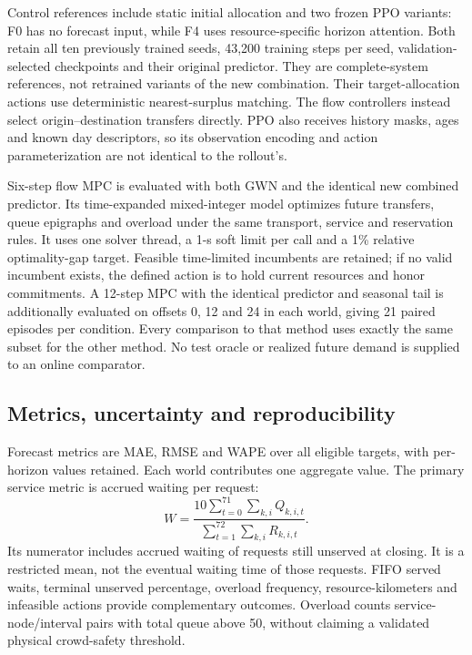 Control references include static initial allocation and two frozen PPO variants: F0 has no forecast input, while F4 uses resource-specific horizon attention. Both retain all ten previously trained seeds, 43,200 training steps per seed, validation-selected checkpoints and their original predictor. They are complete-system references, not retrained variants of the new combination. Their target-allocation actions use deterministic nearest-surplus matching. The flow controllers instead select origin--destination transfers directly. PPO also receives history masks, ages and known day descriptors, so its observation encoding and action parameterization are not identical to the rollout's.

Six-step flow MPC is evaluated with both GWN and the identical new combined predictor. Its time-expanded mixed-integer model optimizes future transfers, queue epigraphs and overload under the same transport, service and reservation rules. It uses one solver thread, a 1-s soft limit per call and a 1\% relative optimality-gap target. Feasible time-limited incumbents are retained; if no valid incumbent exists, the defined action is to hold current resources and honor commitments. A 12-step MPC with the identical predictor and seasonal tail is additionally evaluated on offsets 0, 12 and 24 in each world, giving 21 paired episodes per condition. Every comparison to that method uses exactly the same subset for the other method. No test oracle or realized future demand is supplied to an online comparator.

\subsection{Metrics, uncertainty and reproducibility}
Forecast metrics are MAE, RMSE and WAPE over all eligible targets, with per-horizon values retained. Each world contributes one aggregate value. The primary service metric is accrued waiting per request:
\begin{equation}
W=\frac{10\sum_{t=0}^{71}\sum_{k,i}Q_{k,i,t}}
        {\sum_{t=1}^{72}\sum_{k,i}R_{k,i,t}}.
\end{equation}
Its numerator includes accrued waiting of requests still unserved at closing. It is a restricted mean, not the eventual waiting time of those requests. FIFO served waits, terminal unserved percentage, overload frequency, resource-kilometers and infeasible actions provide complementary outcomes. Overload counts service-node/interval pairs with total queue above 50, without claiming a validated physical crowd-safety threshold.

